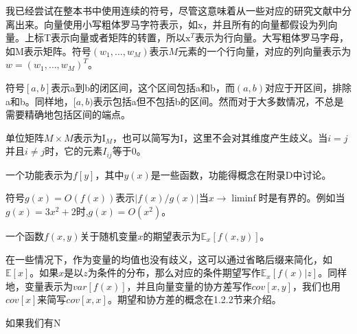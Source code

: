 \documentclass[a4paper,12pt]{book}
\begin{document}
\begin{CJK}{UTF8}{gbsn}
我已经尝试在整本书中使用连续的符号，尽管这意味着从一些对应的研究文献中分离出来。向量使用小写粗体罗马字符表示，如$\mathrm{x}$，并且所有的向量都假设为列向量。上标T表示向量或者矩阵的转置，所以$\mathrm{x}^T$表示为行向量。大写粗体罗马字母，如$\mathrm{M}$表示矩阵。符号$(w_1,\dots,w_M)$表示$M$元素的一个行向量，对应的列向量表示为$w = (w_1, \dots, w_M)^T$。

符号$[a, b]$表示a到b的闭区间，这个区间包括a和b，而$(a, b)$对应于开区间，排除a和b。同样地，$[a, b)$表示包括a但不包括b的区间。然而对于大多数情况，不总是需要精确地包括区间的端点。

单位矩阵$M \times M$表示为$\mathrm{I}_M$，也可以简写为$\mathrm{I}$，这里不会对其维度产生歧义。当$i = j$并且$i \neq j$时，它的元素$I_{ij}$等于0。

一个功能表示为$f[y]$，其中$y(x)$是一些函数，功能得概念在附录D中讨论。

符号$g(x) = O(f(x))$表示$|f(x)/g(x)|$当$x \to \liminf$时是有界的。例如当$g(x) = 3x^2 +2$时,$g(x) = O(x^2)$。

一个函数$f(x,y)$关于随机变量$x$的期望表示为$\mathbb{E}_x[f(x,y)]$。

在一些情况下，作为变量的均值也没有歧义，这可以通过省略后缀来简化，如$\mathbb{E}[x]$。如果$x$是以$z$为条件的分布，那么对应的条件期望写作$\mathbb{E}_x[f(x)|z]$。同样地，变量表示为$var[f(x)]$，并且向量变量的协方差写作$cov[x,y]$，我们也用$cov[x]$来简写$cov[x,x]$。期望和协方差的概念在1.2.2节来介绍。

如果我们有N

\tableofcontents
\mainmatter




\backmatter
\end{CJK}
\end{document}
